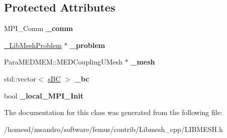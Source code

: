 \subsection*{Protected Attributes}
\begin{DoxyCompactItemize}
\item 
\hypertarget{class_l_i_b_m_e_s_h_a672bcec2de95c12d86d594f54bfb6e55}{M\-P\-I\-\_\-\-Comm {\bfseries \-\_\-comm}}\label{class_l_i_b_m_e_s_h_a672bcec2de95c12d86d594f54bfb6e55}

\item 
\hypertarget{class_l_i_b_m_e_s_h_a836c17ddc2b45f517af79325175bcb38}{\hyperlink{class___lib_mesh_problem}{\-\_\-\-Lib\-Mesh\-Problem} $\ast$ {\bfseries \-\_\-problem}}\label{class_l_i_b_m_e_s_h_a836c17ddc2b45f517af79325175bcb38}

\item 
\hypertarget{class_l_i_b_m_e_s_h_a73ffe80e881ed92baa61c7063420ebc6}{Para\-M\-E\-D\-M\-E\-M\-::\-M\-E\-D\-Coupling\-U\-Mesh $\ast$ {\bfseries \-\_\-mesh}}\label{class_l_i_b_m_e_s_h_a73ffe80e881ed92baa61c7063420ebc6}

\item 
\hypertarget{class_l_i_b_m_e_s_h_a95ac038769a7a6f8e76423c99e04929a}{std\-::vector$<$ \hyperlink{struct_l_i_b_m_e_s_h_1_1s_b_c}{s\-B\-C} $>$ {\bfseries \-\_\-bc}}\label{class_l_i_b_m_e_s_h_a95ac038769a7a6f8e76423c99e04929a}

\item 
\hypertarget{class_l_i_b_m_e_s_h_a979cb8ef6d2003c3c038c63de18c9e85}{bool {\bfseries \-\_\-local\-\_\-\-M\-P\-I\-\_\-\-Init}}\label{class_l_i_b_m_e_s_h_a979cb8ef6d2003c3c038c63de18c9e85}

\end{DoxyCompactItemize}


The documentation for this class was generated from the following file\-:\begin{DoxyCompactItemize}
\item 
/homesd/msandro/software/femus/contrib/\-Libmesh\-\_\-cpp/L\-I\-B\-M\-E\-S\-H.\-h\end{DoxyCompactItemize}
